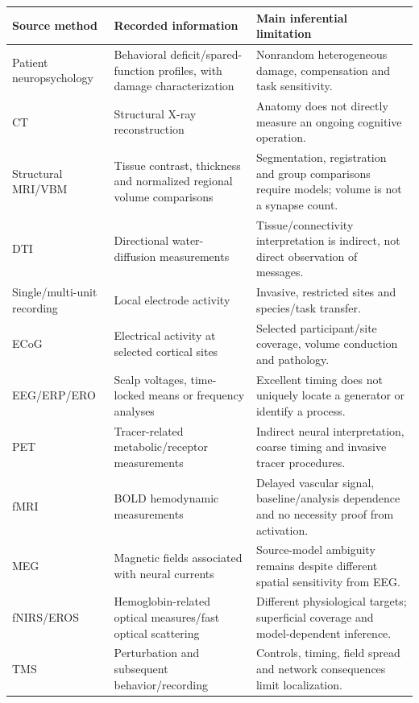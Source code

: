 \begin{center}
\begin{tabular}{@{}p{}p{}p{}@{}}
\toprule
Source method & Recorded information & Main inferential limitation\\
\midrule
Patient neuropsychology & Behavioral deficit/spared-function profiles,
with damage characterization & Nonrandom heterogeneous damage,
compensation and task sensitivity.\\
CT & Structural X-ray reconstruction & Anatomy does not directly
measure an ongoing cognitive operation.\\
Structural MRI/VBM & Tissue contrast, thickness and normalized regional
volume comparisons & Segmentation, registration and group comparisons
require models; volume is not a synapse count.\\
DTI & Directional water-diffusion measurements & Tissue/connectivity
interpretation is indirect, not direct observation of messages.\\
Single/multi-unit recording & Local electrode activity & Invasive,
restricted sites and species/task transfer.\\
ECoG & Electrical activity at selected cortical sites & Selected
participant/site coverage, volume conduction and pathology.\\
EEG/ERP/ERO & Scalp voltages, time-locked means or frequency analyses
& Excellent timing does not uniquely locate a generator or identify a process.\\
PET & Tracer-related metabolic/receptor measurements & Indirect neural
interpretation, coarse timing and invasive tracer procedures.\\
fMRI & BOLD hemodynamic measurements & Delayed vascular signal,
baseline/analysis dependence and no necessity proof from activation.\\
MEG & Magnetic fields associated with neural currents & Source-model
ambiguity remains despite different spatial sensitivity from EEG.\\
fNIRS/EROS & Hemoglobin-related optical measures/fast optical scattering
& Different physiological targets; superficial coverage and model-dependent inference.\\
TMS & Perturbation and subsequent behavior/recording & Controls,
timing, field spread and network consequences limit localization.\\
\bottomrule
\end{tabular}
\end{center}

